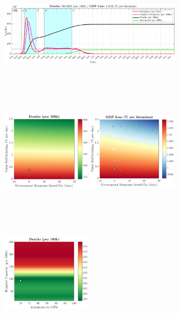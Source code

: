 \documentclass[paper=a4, fontsize=11pt]{scrartcl}
\numberwithin{figure}{section}
\numberwithin{table}{section}
\begin{document}
\begin{figure}[H]
\centering
    \begin{subfigure}[b]{\textwidth}
     	\includegraphics[width=\textwidth,height=5.5cm]{Counterfactuals/US_cv19}
    \end{subfigure}
    \begin{subfigure}[b]{\textwidth}
      	\includegraphics[width=0.49\textwidth,height=6cm]{US/COVID/ero_d}
	\hspace{0.05cm}
    	\includegraphics[width=0.49\textwidth,height=6cm]{US/COVID/ero_g}
    \end{subfigure}
    \begin{subfigure}[b]{\textwidth}
      	\includegraphics[width=0.49\textwidth,height=6cm]{US/COVID/npl_d}

\end{subfigure}
\end{figure}
\end{document}
